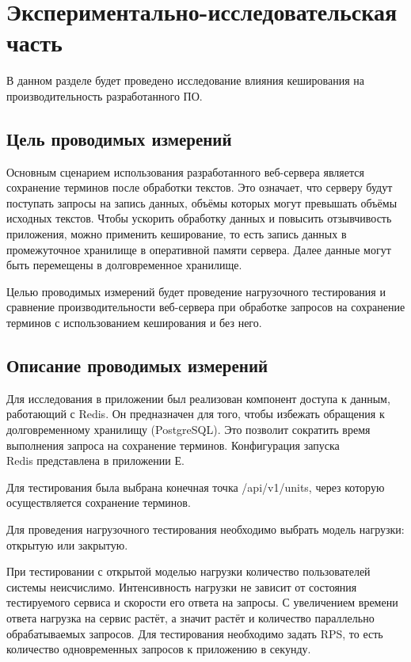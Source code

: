 \section{Экспериментально-исследовательская часть}

В данном разделе будет проведено исследование влияния кеширования на производительность разработанного ПО.

\subsection{Цель проводимых измерений}

Основным сценарием использования разработанного веб-сервера является сохранение терминов после обработки текстов. Это означает, что серверу будут поступать запросы на запись данных, объёмы которых могут превышать объёмы исходных текстов. Чтобы ускорить обработку данных и повысить отзывчивость приложения, можно применить кеширование, то есть запись данных в промежуточное хранилище в оперативной памяти сервера. Далее данные могут быть перемещены в долговременное хранилище.

Целью проводимых измерений будет проведение нагрузочного тестирования и сравнение производительности веб-сервера при обработке запросов на сохранение терминов с использованием кеширования и без него.


	
\subsection{Описание проводимых измерений}

Для исследования в приложении был реализован компонент доступа к данным, работающий с Redis. Он предназначен для того, чтобы избежать обращения к долговременному хранилищу (PostgreSQL). Это позволит сократить время выполнения запроса на сохранение терминов. Конфигурация запуска \\Redis представлена в приложении Е.

Для тестирования была выбрана конечная точка /api/v1/units, через которую осуществляется сохранение терминов. 

Для проведения нагрузочного тестирования необходимо выбрать модель нагрузки: открытую или закрытую.

При тестировании с открытой моделью нагрузки количество пользователей системы неисчислимо. Интенсивность нагрузки не зависит от состояния тестируемого сервиса и скорости его ответа на запросы. %
С увеличением времени ответа нагрузка на сервис растёт, а значит растёт и количество параллельно обрабатываемых запросов.
Для тестирования необходимо задать RPS, то есть количество одновременных запросов к приложению в секунду.

